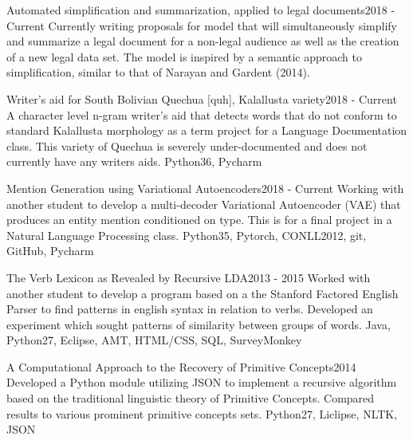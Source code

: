 %
%
%


\begin{projects}
	\projectsimple
	{Automated simplification and summarization, applied to legal documents}{2018 - Current}
	{Currently writing proposals for model that will simultaneously simplify and summarize a legal document for a non-legal audience as well as the creation of a new legal data set. The model is inspired by a semantic approach to simplification, similar to that of Narayan and Gardent (2014). }

	\projectnolink
	{Writer's aid for South Bolivian Quechua [quh], Kalallusta variety}{2018 - Current}
	{A character level n-gram writer's aid that detects words that do not conform to standard Kalallusta morphology as a term project for a Language Documentation class. This variety of Quechua is severely under-documented and does not currently have any writers aids. }
	{Python36, Pycharm}

	\projectnolink
	{Mention Generation using Variational Autoencoders}{2018 - Current}
	{Working with another student to develop a multi-decoder Variational Autoencoder (VAE) that produces an entity mention conditioned on type. This is for a final project in a Natural Language Processing class.  }
	{Python35, Pytorch, CONLL2012, git, GitHub, Pycharm}


	\project
	{The Verb Lexicon as Revealed by Recursive LDA}{2013 - 2015}
	{ }
	{Worked with another student to develop a program based on a the Stanford Factored English Parser to find patterns in english syntax in relation to verbs. Developed an experiment which sought patterns of similarity between groups of words.}
	{Java, Python27, Eclipse, AMT, HTML/CSS, SQL, SurveyMonkey}
				
	\project
	{A Computational Approach to the Recovery of Primitive Concepts}{2014}
	{ }
	{Developed a Python module utilizing JSON to implement a recursive algorithm based on the traditional linguistic theory of Primitive Concepts. Compared results to various prominent primitive concepts sets.}
	{Python27, Liclipse, NLTK, JSON}

\end{projects}
